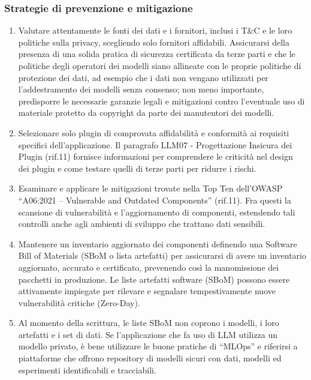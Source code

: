 \documentclass[
]{article}
\providecommand{\tightlist}{%
  \setlength{\itemsep}{0pt}\setlength{\parskip}{0pt}}
\begin{document}
\subsubsection{Strategie di prevenzione e
mitigazione}\label{strategie-di-prevenzione-e-mitigazione}

\begin{enumerate}
\def\labelenumi{\arabic{enumi}.}
\tightlist
\item
  Valutare attentamente le fonti dei dati e i fornitori, inclusi i T\&C
  e le loro politiche sulla privacy, scegliendo solo fornitori
  affidabili. Assicurarsi della presenza di una solida pratica di
  sicurezza certificata da terze parti e che le politiche degli
  operatori dei modelli siano allineate con le proprie politiche di
  protezione dei dati, ad esempio che i dati non vengano utilizzati per
  l'addestramento dei modelli senza consenso; non meno importante,
  predisporre le necessarie garanzie legali e mitigazioni contro
  l'eventuale uso di materiale protetto da copyright da parte dei
  manutentori dei modelli.
\item
  Selezionare solo plugin di comprovata affidabilità e conformità ai
  requisiti specifici dell'applicazione. Il paragrafo LLM07 -
  Progettazione Insicura dei Plugin (rif.11) fornisce informazioni per
  comprendere le criticità nel design dei plugin e come testare quelli
  di terze parti per ridurre i rischi.
\item
  Esaminare e applicare le mitigazioni trovate nella Top Ten dell'OWASP
  ``A06:2021 -- Vulnerable and Outdated Components'' (rif.11). Fra
  questi la scansione di vulnerabilità e l'aggiornamento di componenti,
  estendendo tali controlli anche agli ambienti di sviluppo che trattano
  dati sensibili.
\item
  Mantenere un inventario aggiornato dei componenti definendo una
  Software Bill of Materials (SBoM o lista artefatti) per assicurarsi di
  avere un inventario aggiornato, accurato e certificato, prevenendo
  così la manomissione dei pacchetti in produzione. Le liste artefatti
  software (SBoM) possono essere attivamente impiegate per rilevare e
  segnalare tempestivamente nuove vulnerabilità critiche (Zero-Day).
\item
  Al momento della scrittura, le liste SBoM non coprono i modelli, i
  loro artefatti e i set di dati. Se l'applicazione che fa uso di LLM
  utilizza un modello privato, è bene utilizzare le buone pratiche di
  ``MLOps'' e riferirsi a piattaforme che offrono repository di modelli
  sicuri con dati, modelli ed esperimenti identificabili e tracciabili.

\end{enumerate}
\end{document}

